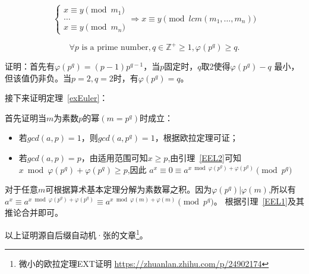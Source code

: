 \begin{inference}
	\begin{displaymath}
		\left\{
		\begin{array}{l}
			x\equiv y \pmod{m_1} \\
			\ldots               \\
			x\equiv y \pmod{m_n}
		\end{array}
		\right.
		\Rightarrow x\equiv y \pmod{lcm(m_1,\ldots,m_n)}
	\end{displaymath}
\end{inference}

\begin{lemma}\label{EEL2}
	\begin{displaymath}
		\forall p\textrm{ is a prime number},q\in \mathbb{Z^+}\ge 1,
		\varphi(p^q)\geq q.
	\end{displaymath}
\end{lemma}

证明：首先有$\varphi(p^q)=(p-1)p^{q-1}$，当$p$固定时，$q$取2使得$\varphi(p^q)-q$
最小，但该值仍非负。当$p=2,q=2$时，有$\varphi(p^q)=q$。

接下来证明定理~\ref{exEuler}：

首先证明当$m$为素数$p$的幂$(m=p^q)$时成立：
\begin{itemize}
	\item 若$gcd(a,p)=1$，则$gcd(a,p^q)=1$，根据欧拉定理可证；
	\item 若$gcd(a,p)=p$，由适用范围可知$x\geq p$,由引理~\ref{EEL2}可知
	      $x \bmod \varphi(p^q) + \varphi(p^q) \geq p$,因此
	      $a^x\equiv 0 \equiv a^{x \bmod \varphi(p^q)+\varphi(p^q)} \pmod{p^q}$
\end{itemize}

对于任意$m$可根据算术基本定理分解为素数幂之积。因为$\varphi(p^q)|\varphi(m)$,所以有
$a^x\equiv a^{x \bmod \varphi(p^q)+\varphi(p^q)}
	\equiv a^{x \bmod \varphi(m)+\varphi(m)} \pmod{p^q}$。
根据引理~\ref{EEL1}及其推论合并即可。

以上证明源自后缀自动机·张的文章\footnote{微小的欧拉定理EXT证明
	\url{https://zhuanlan.zhihu.com/p/24902174}}。
